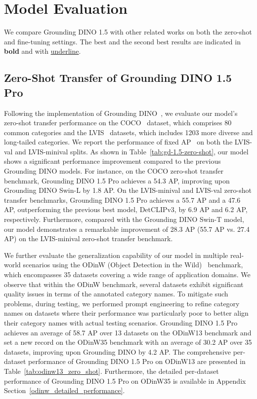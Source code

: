 \section{Model Evaluation}
We compare Grounding DINO 1.5 with other related works on both the zero-shot and fine-tuning settings. The best and the second best results are indicated in \textbf{bold} and with \underline{underline}.

\subsection{Zero-Shot Transfer of Grounding DINO 1.5 Pro}

Following the implementation of Grounding DINO~\cite{GroundingDINO}, we evaluate our model's zero-shot transfer performance on the COCO~\cite{COCO} dataset, which comprises 80 common categories and the LVIS~\cite{LVIS} datasets, which includes 1203 more diverse and long-tailed categories. We report the performance of fixed AP~\cite{FixedAP} on both the LVIS-val and LVIS-minival splits. As shown in Table~\ref{tab:gd-1.5-zero-shot}, our model shows a significant performance improvement compared to the previous Grounding DINO models. For instance, on the COCO zero-shot transfer benchmark, Grounding DINO 1.5 Pro achieves a 54.3 AP, improving upon Grounding DINO Swin-L by 1.8 AP. On the LVIS-minival and LVIS-val zero-shot transfer benchmarks, Grounding DINO 1.5 Pro achieves a 55.7 AP and a 47.6 AP, outperforming the previous best model, DetCLIPv3, by 6.9 AP and 6.2 AP, respectively. Furthermore, compared with the Grounding DINO Swin-T model, our model demonstrates a remarkable improvement of 28.3 AP (55.7 AP vs. 27.4 AP) on the LVIS-minival zero-shot transfer benchmark.





We further evaluate the generalization capability of our model in multiple real-world scenarios using the ODinW (Object Detection in the Wild)~\cite{GLIP} benchmark, which encompasses 35 datasets covering a wide range of application domains. We observe that within the ODinW benchmark, several datasets exhibit significant quality issues in terms of the annotated category names. To mitigate such problems, during testing, we performed prompt engineering to refine category names on datasets where their performance was particularly poor to better align their category names with actual testing scenarios. Grounding DINO 1.5 Pro achieves an average of 58.7 AP over 13 datasets on the ODinW13 benchmark and set a new record on the ODinW35 benchmark with an average of 30.2 AP over 35 datasets, improving upon Grounding DINO by 4.2 AP. The comprehensive per-dataset performance of Grounding DINO 1.5 Pro on ODinW13 are presented in Table~\ref{tab:odinw13_zero_shot}. Furthermore, the detailed per-dataset performance of Grounding DINO 1.5 Pro on ODinW35 is available in Appendix Section~\ref{odinw_detailed_performance}.

